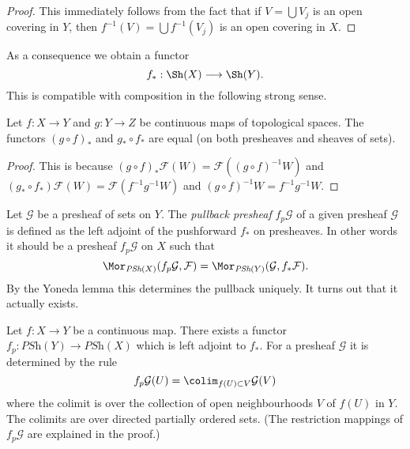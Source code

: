 \begin{proof}
This immediately follows from the fact that
if $V = \bigcup V_j$ is an open covering in $Y$,
then $f^{-1}(V) = \bigcup f^{-1}(V_j)$ is an open covering in $X$.
\end{proof}

\noindent
As a consequence we obtain a functor
$$
f_* : \Sh(X) \longrightarrow \Sh(Y).
$$
This is compatible with composition in the following
strong sense.

\begin{lemma}
\label{lemma-pushforward-composition}
Let $f : X \to Y$ and $g : Y \to Z$ be continuous maps
of topological spaces. The functors $(g \circ f)_*$
and $g_* \circ f_*$ are equal (on both presheaves
and sheaves of sets).
\end{lemma}

\begin{proof}
This is because $(g \circ f)_*\mathcal{F}(W) =
\mathcal{F}((g \circ f)^{-1}W)$ and
$(g_* \circ f_*)\mathcal{F}(W) = \mathcal{F}(f^{-1} g^{-1} W)$
and $(g \circ f)^{-1}W = f^{-1} g^{-1} W$.
\end{proof}

\noindent
Let $\mathcal{G}$ be a presheaf of sets on $Y$.
The {\it pullback presheaf} $f_p\mathcal{G}$
of a given presheaf $\mathcal{G}$ is defined as the left adjoint
of the pushforward $f_*$ on presheaves. In other words it
should be a presheaf $f_p \mathcal{G}$ on $X$ such that
$$
\Mor_{\textit{PSh}(X)}(f_p\mathcal{G}, \mathcal{F})
=
\Mor_{\textit{PSh}(Y)}(\mathcal{G}, f_*\mathcal{F}).
$$
By the Yoneda lemma this determines the pullback uniquely.
It turns out that it actually exists.

\begin{lemma}
\label{lemma-pullback-presheaves}
Let $f : X \to Y$ be a continuous map.
There exists a functor
$f_p : \textit{PSh}(Y) \to \textit{PSh}(X)$
which is left adjoint to $f_*$. For a presheaf
$\mathcal{G}$ it is determined by the rule
$$
f_p\mathcal{G}(U) = \colim_{f(U) \subset V} \mathcal{G}(V)
$$
where the colimit is over the collection of open neighbourhoods
$V$ of $f(U)$ in $Y$. The colimits are over
directed partially ordered sets.
(The restriction mappings of $f_p\mathcal{G}$ are explained in the proof.)
\end{lemma}

